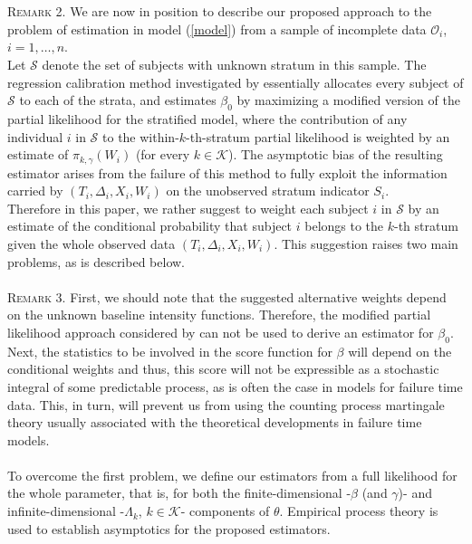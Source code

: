 \documentclass{statsoc}
\begin{document}
\\\\
\textsc{Remark 2.} We are now in position to describe our proposed approach to the problem of estimation in model (\ref{model}) from a sample of incomplete data $\mathcal O_i$, $i=1,\ldots,n$.
\\
Let $\mathcal S$ denote the set of subjects with unknown stratum in this sample. The regression calibration method investigated by \cite{duplec} essentially allocates every subject of $\mathcal S$ to each of the strata, and estimates $\beta_0$ by maximizing a modified version of the partial likelihood for the stratified model, where the contribution of any individual $i$ in $\mathcal S$ to the within-$k$-th-stratum partial likelihood is weighted by an estimate of $\pi_{k,\gamma}(W_i)$ (for every $k\in\mathcal K$). The asymptotic bias of the resulting estimator arises from the failure of this method to fully exploit the information carried by $(T_i, \Delta_i, X_i, W_i)$ on the unobserved stratum indicator $S_i$.
\\
Therefore in this paper, we rather suggest to weight each subject $i$ in $\mathcal S$ by an estimate of the conditional probability that subject $i$ belongs to the $k$-th stratum given the whole observed data $(T_i, \Delta_i, X_i, W_i)$. This suggestion raises two main problems, as is described below.
\\\\
\textsc{Remark 3.} First, we should note that the suggested alternative weights depend on the unknown baseline intensity functions. Therefore, the modified partial likelihood approach considered by \cite{duplec} can not be used to derive an estimator for $\beta_0$. Next, the statistics to be involved in the score function for $\beta$ will depend on the conditional weights and thus, this score will not be expressible as a stochastic integral of some predictable process, as is often the case in models for failure time data. This, in turn, will prevent us from using the counting process martingale theory usually associated with the theoretical developments in failure time models.
\\\\
To overcome the first problem, we define our estimators from a full likelihood for the whole parameter, that is, for both the finite-dimensional -$\beta$ (and $\gamma$)- and infinite-dimensional -$\Lambda_k$, $k\in\mathcal K$- components of $\theta$. Empirical process theory \citep{vdvw96} is used to establish asymptotics for the proposed estimators.
\end{document}
